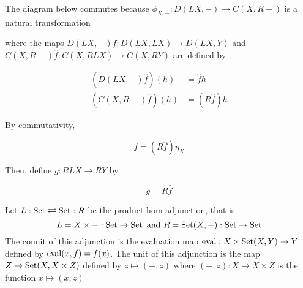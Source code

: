 \documentclass{article}
\begin{document}
\begin{longproof}

The diagram below commutes because $\phi_{X, -}: D(LX, -) \to C(X, R-)$ is a natural transformation

\begin{center}
\end{center}

where the maps $D(LX, -) \hat{f}: D(LX, LX) \to D(LX, Y)$ and $C(X, R-)\hat{f}: C(X, RLX) \to C(X, RY)$ are defined by

\begin{align*}
    (D(LX, -) \hat{f})(h) &= \hat{f} h \\
    (C(X, R-) \hat{f})(h) &= (R \hat{f}) h
\end{align*}

By commutativity,

$$
    f = (R \hat{f}) \eta_X
$$

Then, define $g: RLX \to RY$ by

$$
    g = R \hat{f}
$$

\end{longproof}

\begin{example}
    Let $L: \operatorname{Set} \rightleftarrows \operatorname{Set}: R$ be the product-hom adjunction, that is
    $$
        L = X \times -: \operatorname{Set} \to \operatorname{Set} \text{ and } R = \operatorname{Set}(X, -): \operatorname{Set} \to \operatorname{Set}
    $$
    The counit of this adjunction is the evaluation map $\operatorname{eval}: X \times \operatorname{Set}(X, Y) \to Y$ defined by $\operatorname{eval}(x, f) = f(x)$. The unit of this adjunction is the map $Z \to \operatorname{Set}(X, X \times Z)$ defined by $z \mapsto (-, z)$ where $(-, z): X \to X \times Z$ is the function $x \mapsto (x, z)$
\end{example}
\end{document}
